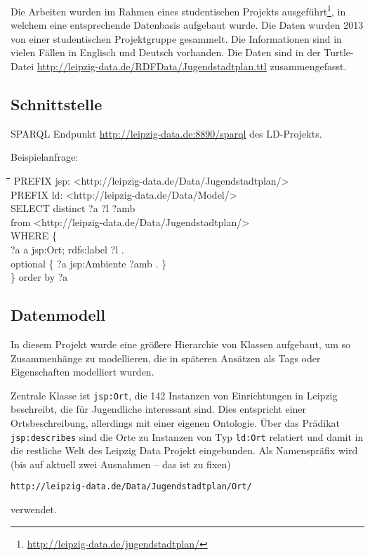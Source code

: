 \documentclass[a4paper,11pt]{article}
\newenvironment{code}{\tt \begin{tabbing}
\hskip12pt\=\hskip12pt\=\hskip12pt\=\hskip12pt\=\hskip5cm\=\hskip5cm\=\kill}
{\end{tabbing}}
\begin{document}
Die Arbeiten wurden im Rahmen eines studentischen Projekts
ausgeführt\footnote{\url{http://leipzig-data.de/jugendstadtplan/}}, in welchem
eine entsprechende Datenbasis aufgebaut wurde. Die Daten wurden 2013 von einer
studentischen Projektgruppe gesammelt. Die Informationen sind in vielen Fällen
in Englisch und Deutsch vorhanden. Die Daten sind in der
Turtle-Datei \url{http://leipzig-data.de/RDFData/Jugendstadtplan.ttl}
zusammengefasst.

\subsection{Schnittstelle}

SPARQL Endpunkt \url{http://leipzig-data.de:8890/sparql} des LD-Projekts.

Beispielanfrage:
\begin{code}  
  PREFIX jsp: <http://leipzig-data.de/Data/Jugendstadtplan/> \\
  PREFIX ld: <http://leipzig-data.de/Data/Model/>\\
  SELECT distinct ?a ?l ?amb\\
  from  <http://leipzig-data.de/Data/Jugendstadtplan/>\\
  WHERE \{\+\\
    ?a a jsp:Ort; rdfs:label ?l . \\
    optional \{ ?a jsp:Ambiente ?amb . \} \-\\
  \} order by ?a
\end{code}

\subsection{Datenmodell}
In diesem Projekt wurde eine größere Hierarchie von Klassen aufgebaut, um so
Zusammenhänge zu modellieren, die in späteren Ansätzen als Tags oder
Eigenschaften modelliert wurden.

Zentrale Klasse ist \texttt{jsp:Ort}, die 142 Instanzen von Einrichtungen in
Leipzig beschreibt, die für Jugendliche interessant sind.  Dies entspricht
einer Ortsbeschreibung, allerdings mit einer eigenen Ontologie. Über das
Prädikat \texttt{jsp:describes} sind die Orte zu Instanzen von Typ
\texttt{ld:Ort} relatiert und damit in die restliche Welt des Leipzig Data
Projekt eingebunden.  Als Namenspräfix wird (bis auf aktuell zwei Ausnahmen --
das ist zu fixen) 
\begin{center}
  \texttt{http://leipzig-data.de/Data/Jugendstadtplan/Ort/}
\end{center}
verwendet.
\end{document}
